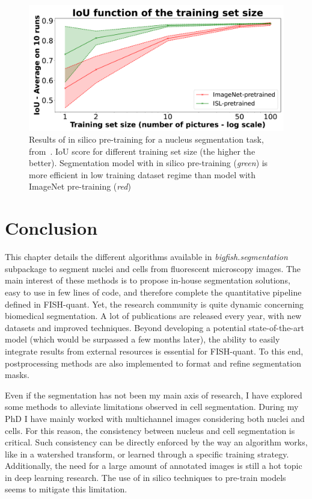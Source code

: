 \begin{figure}[]
    \centering
    \includegraphics[width=\textwidth]{figures/chapter3/insilico_training_size}
    \caption[Results of in silico pre-training]{Results of in silico pre-training for a nucleus segmentation task, from~\cite{anonymous_Bonte_2022}.
	IoU score for different training set size (the higher the better).
	Segmentation model with in silico pre-training (\textit{green}) is more efficient in low training dataset regime than model with ImageNet pre-training (\textit{red})}
    \label{fig:results_insilico}
\end{figure}

\section{Conclusion}
\label{sec:segmentation_conclusion}

This chapter details the different algorithms available in \emph{bigfish.segmentation} subpackage to segment nuclei and cells from fluorescent microscopy images.
The main interest of these methods is to propose in-house segmentation solutions, easy to use in few lines of code, and therefore complete the quantitative pipeline defined in FISH-quant.
Yet, the research community is quite dynamic concerning biomedical segmentation.
A lot of publications are released every year, with new datasets and improved techniques.
Beyond developing a potential state-of-the-art model (which would be surpassed a few months later), the ability to easily integrate results from external resources is essential for FISH-quant.
To this end, postprocessing methods are also implemented to format and refine segmentation masks.

Even if the segmentation has not been my main axis of research, I have explored some methods to alleviate limitations observed in cell segmentation.
During my PhD I have mainly worked with multichannel images considering both nuclei and cells.
For this reason, the consistency between nucleus and cell segmentation is critical.
Such consistency can be directly enforced by the way an algorithm works, like in a watershed transform, or learned through a specific training strategy.
Additionally, the need for a large amount of annotated images is still a hot topic in deep learning research.
The use of in silico techniques to pre-train models seems to mitigate this limitation.
